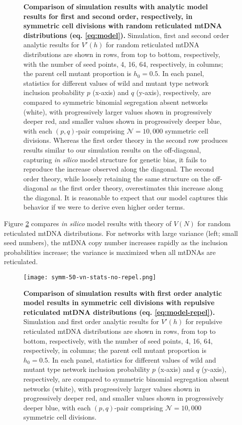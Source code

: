 \documentclass{article}
\begin{document}
\begin{appendices}
\begin{figure}[!ht]
        \caption{\textbf{Comparison of simulation results with analytic model results for first and second order, respectively, in symmetric cell divisions with         random reticulated mtDNA distributions (eq. \ref{eq:model}).} Simulation, first and second order analytic results for $V'(h)$ for random reticulated mtDNA distributions are shown in rows, from top to bottom, respectively, with the number of seed points, 4, 16, 64, respectively, in columns; the parent cell mutant proportion is $h_0=0.5$. In each panel, statistics for different values of wild and mutant type network inclusion probability $p$ (x-axis) and $q$ (y-axis), respectively, are compared to symmetric binomial segregation absent networks (white), with progressively larger values shown in progressively deeper red, and smaller values shown in progressively deeper blue, with each $(p,q)$-pair comprising $\mathcal{N}=10,000$ symmetric cell divisions. Whereas the first order theory in the second row produces results similar to our simulation results on the off-diagonal, capturing \textit{in silico} model structure for genetic bias, it fails to reproduce the increase observed along the diagonal. The second order theory, while loosely retaining the same structure on the off-diagonal as the first order theory, overestimates this increase along the diagonal. It is reasonable to expect that our model captures this behavior if we were to derive even higher order terms.}\label{fig:app-vh-stats}
\end{figure}
Figure \ref{fig:app-vn-stats} compares \textit{in silico} model results with theory of $V(N)$ for random reticulated mtDNA distributions. For networks with large variance (left; small seed numbers), the mtDNA copy number increases rapidly as the inclusion probabilities increase; the variance is maximized when all mtDNAs are reticulated.
\begin{figure}[!ht]
        \centering \texttt{[image: symm-50-vn-stats-no-repel.png]}
        \caption{\textbf{Comparison of simulation results with first order analytic model results in symmetric cell divisions with repulsive reticulated mtDNA distributions (eq. \ref{eq:model-repel}).} Simulation and first order analytic results for $V'(h)$ for repulsive reticulated mtDNA distributions are shown in rows, from top to bottom, respectively, with the number of seed points, 4, 16, 64, respectively, in columns; the parent cell mutant proportion is $h_0=0.5$. In each panel, statistics for different values of wild and mutant type network inclusion probability $p$ (x-axis) and $q$ (y-axis), respectively, are compared to symmetric binomial segregation absent networks (white), with progressively larger values shown in progressively deeper red, and smaller values shown in progressively deeper blue, with each $(p,q)$-pair comprising $\mathcal{N}=10,000$ symmetric cell divisions.}\label{fig:app-vn-stats}

\end{figure}
\end{appendices}
\end{document}
